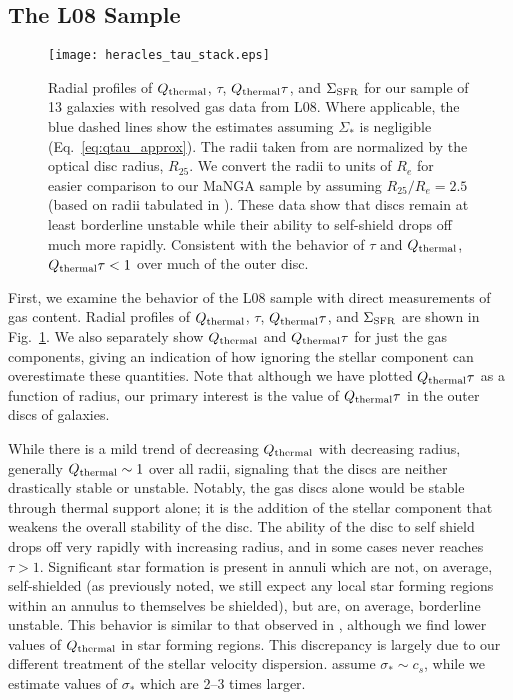 \documentclass[fleqn,usenatbib]{mnras}
\newcommand{\qh}{Q_{\rm thermal}}
\begin{document}
\subsection{The L08 Sample}

\begin{figure*}
\texttt{[image: heracles\_tau\_stack.eps]}
\caption{Radial profiles of $\qh$, $\tau$, $\qh\tau$, and $\Sigma_{\rm SFR}$ for our sample of 13 galaxies with resolved gas data from L08.  Where applicable, the blue dashed lines show the estimates assuming $\Sigma_*$ is negligible (Eq.~\ref{eq:qtau_approx}).  The radii taken from \citet{Leroy08} are normalized by the optical disc radius, $R_{25}$.  We convert the radii to units of $R_e$ for easier comparison to our MaNGA sample by assuming $R_{25}/R_e=2.5$ (based on radii tabulated in \citealt{Jansen00b}). These data show that discs remain at least borderline unstable while their ability to self-shield drops off much more rapidly. Consistent with the behavior of $\tau$ and $\qh$,  $\qh\tau < 1$ over much of the outer disc.  }
\label{fig:qtau_wgas}
\end{figure*}

First, we examine the behavior of the L08 sample with direct measurements of gas content. Radial profiles of $\qh$, $\tau$, $\qh\tau$, and $\Sigma_{\rm SFR}$ are shown in Fig.~\ref{fig:qtau_wgas}.  We also separately show $\qh$ and $\qh\tau$ for just the gas components, giving an indication of how ignoring the stellar component can overestimate these quantities. Note that although we have plotted $\qh\tau$ as a function of radius, our primary interest is the value of $\qh\tau$ in the outer discs of galaxies.

While there is a mild trend of decreasing $\qh$ with decreasing radius, generally $\qh\sim1$ over all radii, signaling that the discs are neither drastically stable or unstable.  Notably, the gas discs alone would be stable through thermal support alone; it is the addition of the stellar component that weakens the overall stability of the disc.  The ability of the disc to self shield drops off very rapidly with increasing radius, and in some cases never reaches $\tau>1$.  Significant star formation is present in annuli which are not, on average, self-shielded (as previously noted, we still expect any local star forming regions within an annulus to themselves be shielded), but are, on average, borderline unstable.  This behavior is similar to that observed in \citet{Orr17}, although we find lower values of $\qh$ in star forming regions.  This discrepancy is largely due to our different treatment of the stellar velocity dispersion. \citet{Orr17} assume $\sigma_*\sim c_s$, while we estimate values of $\sigma_*$ which are 2--3 times larger.
\end{document}
